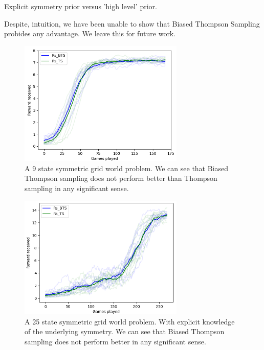 
Explicit symmetry prior versus 'high level' prior.

Despite, intuition, we have been unable to show that Biased Thompson Sampling probides any advantage. We leave this for future work.


\begin{figure}[h!]
  \centering
  \includegraphics[width=0.7\textwidth,height=0.35\textheight]{../../pictures/figures/mdp-9-implicit.png}
  \caption{A 9 state symmetric grid world problem.
	We can see that Biased Thompson sampling does not perform better than Thompson sampling in any significant sense.}
\end{figure}

\begin{figure}[h!]
  \centering
  \includegraphics[width=0.7\textwidth,height=0.35\textheight]{../../pictures/figures/mdp-25-explicit.png}
  \caption{A 25 state symmetric grid world problem. With explicit knowledge of the underlying symmetry.
	We can see that Biased Thompson sampling does not perform better in any significant sense.}
	\label{fig:explicit-sym}
\end{figure}


